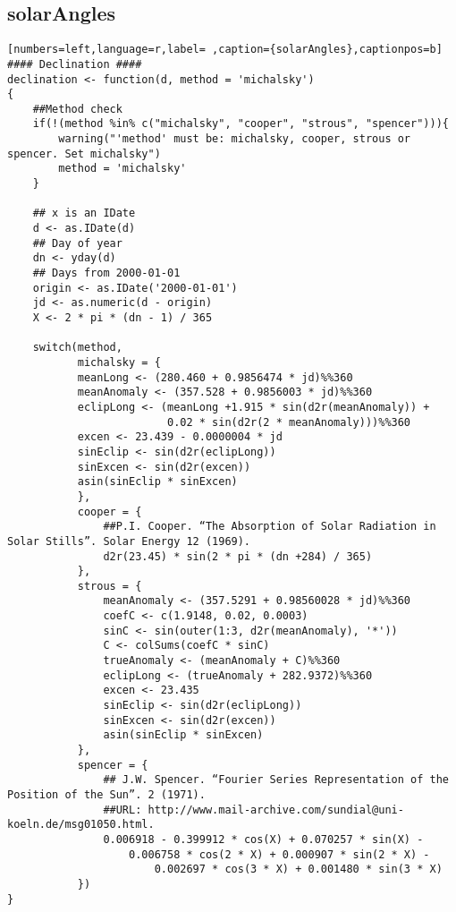 \subsection{solarAngles}
\label{sec:org98edf16}
\label{subsec:solarangles}
\begin{lstlisting}[numbers=left,language=r,label= ,caption={solarAngles},captionpos=b]
#### Declination ####
declination <- function(d, method = 'michalsky')
{
    ##Method check
    if(!(method %in% c("michalsky", "cooper", "strous", "spencer"))){
        warning("'method' must be: michalsky, cooper, strous or spencer. Set michalsky")
        method = 'michalsky'
    }

    ## x is an IDate
    d <- as.IDate(d)
    ## Day of year
    dn <- yday(d)
    ## Days from 2000-01-01
    origin <- as.IDate('2000-01-01')
    jd <- as.numeric(d - origin)
    X <- 2 * pi * (dn - 1) / 365

    switch(method,
           michalsky = {
           meanLong <- (280.460 + 0.9856474 * jd)%%360
           meanAnomaly <- (357.528 + 0.9856003 * jd)%%360
           eclipLong <- (meanLong +1.915 * sin(d2r(meanAnomaly)) +
                         0.02 * sin(d2r(2 * meanAnomaly)))%%360
           excen <- 23.439 - 0.0000004 * jd
           sinEclip <- sin(d2r(eclipLong))
           sinExcen <- sin(d2r(excen))
           asin(sinEclip * sinExcen)
           },
           cooper = {
               ##P.I. Cooper. “The Absorption of Solar Radiation in Solar Stills”. Solar Energy 12 (1969).
               d2r(23.45) * sin(2 * pi * (dn +284) / 365)
           },
           strous = {
               meanAnomaly <- (357.5291 + 0.98560028 * jd)%%360
               coefC <- c(1.9148, 0.02, 0.0003)
               sinC <- sin(outer(1:3, d2r(meanAnomaly), '*'))
               C <- colSums(coefC * sinC)
               trueAnomaly <- (meanAnomaly + C)%%360
               eclipLong <- (trueAnomaly + 282.9372)%%360
               excen <- 23.435
               sinEclip <- sin(d2r(eclipLong))
               sinExcen <- sin(d2r(excen))
               asin(sinEclip * sinExcen)
           },
           spencer = {
               ## J.W. Spencer. “Fourier Series Representation of the Position of the Sun”. 2 (1971).
               ##URL: http://www.mail-archive.com/sundial@uni-koeln.de/msg01050.html.
               0.006918 - 0.399912 * cos(X) + 0.070257 * sin(X) -
                   0.006758 * cos(2 * X) + 0.000907 * sin(2 * X) -
                       0.002697 * cos(3 * X) + 0.001480 * sin(3 * X)           
           })
}



\end{lstlisting}
